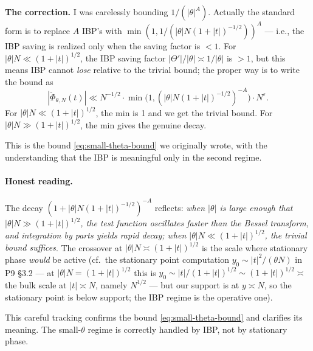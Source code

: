 \documentclass[11pt]{article}
\theoremstyle{definition}
\begin{document}
\textbf{The correction.} I was carelessly bounding $1/(|\theta|^A)$. Actually the standard form is to replace $A$ IBP's with $\min(1, 1/(|\theta|N(1+|t|)^{-1/2}))^A$ — i.e., the IBP saving is realized only when the saving factor is $< 1$. For $|\theta|N \ll (1+|t|)^{1/2}$, the IBP saving factor $|\Theta'|/|\theta| \asymp 1/|\theta|$ is $> 1$, but this means IBP cannot \emph{lose} relative to the trivial bound; the proper way is to write the bound as
\[
   |\check\Phi_{\theta,N}(t)| \ll N^{-1/2}\cdot\min\bigl(1, (|\theta|N(1+|t|)^{-1/2})^{-A}\bigr) \cdot N^\varepsilon.
\]
For $|\theta|N \ll (1+|t|)^{1/2}$, the min is 1 and we get the trivial bound. For $|\theta|N \gg (1+|t|)^{1/2}$, the min gives the genuine decay.

This is the bound \eqref{eq:small-theta-bound} we originally wrote, with the understanding that the IBP is meaningful only in the second regime.

\paragraph{Honest reading.}
The decay $(1+|\theta|N(1+|t|)^{-1/2})^{-A}$ reflects: \emph{when $|\theta|$ is large enough that $|\theta|N \gg (1+|t|)^{1/2}$, the test function oscillates faster than the Bessel transform, and integration by parts yields rapid decay; when $|\theta|N \ll (1+|t|)^{1/2}$, the trivial bound suffices}. The crossover at $|\theta|N \asymp (1+|t|)^{1/2}$ is the scale where stationary phase \emph{would} be active (cf.\ the stationary point computation $y_0 \sim |t|^2/(\theta N)$ in P9 \S 3.2 — at $|\theta|N = (1+|t|)^{1/2}$ this is $y_0 \sim |t|/(1+|t|)^{1/2} \sim (1+|t|)^{1/2} \asymp$ the bulk scale at $|t| \asymp N$, namely $N^{1/2}$ — but our support is at $y \asymp N$, so the stationary point is below support; the IBP regime is the operative one).

This careful tracking confirms the bound \eqref{eq:small-theta-bound} and clarifies its meaning. The small-$\theta$ regime is correctly handled by IBP, not by stationary phase.
\end{document}
